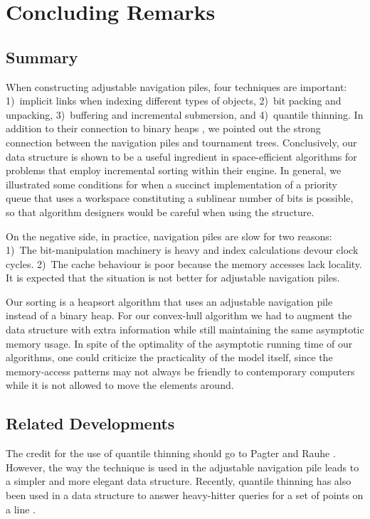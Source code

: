 \documentclass[final,onetabnum,onefignum,onethmnum]{siamltex}
\begin{document}
\section{Concluding Remarks}
\label{sec:remarks}

\subsection{Summary} 

When constructing adjustable navigation piles, four techniques
are important: 1)~implicit links when indexing different types of
objects, 2)~bit packing and unpacking, 3)~buffering and incremental
submersion, and 4)~quantile thinning.  In addition to their connection
to binary heaps \cite{Wil64}, we pointed out the strong connection 
between the navigation piles and tournament trees.  
Conclusively, our data structure is shown to be a useful ingredient in space-efficient algorithms 
for problems that employ incremental sorting within their engine.
In general, we illustrated some conditions for when a succinct
implementation of a priority queue that uses a workspace constituting a sublinear number of bits is possible,
so that algorithm designers would be careful when using the structure.  

On the negative side, in practice, navigation piles are slow
\cite{JK06} for two reasons: 1)~The bit-manipulation machinery is
heavy and index calculations devour clock cycles. 2)~The cache
behaviour is poor because the memory accesses lack locality.
It is expected that the situation is not better for adjustable navigation piles.


Our sorting is a heapsort algorithm \cite{Wil64} that uses
an adjustable navigation pile instead of a binary heap.  For our
convex-hull algorithm we had to augment the data structure with extra
information while still maintaining the same asymptotic memory usage.
In spite of the optimality of the asymptotic running time of our
algorithms, one could criticize the practicality of the model itself, since the
memory-access patterns may not always be friendly to contemporary
computers while it is not allowed to move the elements around.

\subsection{Related Developments}
The credit for the use of quantile thinning should go to Pagter and
Rauhe \cite{PR98}.  However, the way the technique is used in the
adjustable navigation pile leads to a simpler and more elegant data
structure.  Recently, quantile thinning has also been used in a data
structure to answer heavy-hitter queries for a set of points on a line
\cite{EHMN11}.
\end{document}
